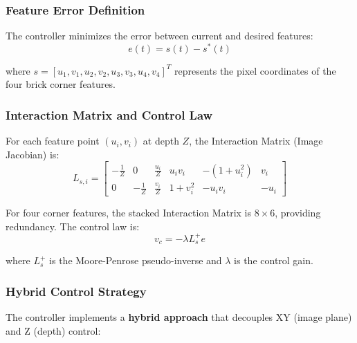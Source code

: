 \subsubsection{Feature Error Definition}
The controller minimizes the error between current and desired features:
\begin{equation}
    e(t) = s(t) - s^*(t)
\end{equation}

where $s = [u_1, v_1, u_2, v_2, u_3, v_3, u_4, v_4]^T$ represents the pixel coordinates of the four brick corner features.

\subsubsection{Interaction Matrix and Control Law}
For each feature point $(u_i, v_i)$ at depth $Z$, the Interaction Matrix (Image Jacobian) is:
\begin{equation}
    L_{s,i} = \begin{bmatrix}
        -\frac{1}{Z} & 0 & \frac{u_i}{Z} & u_i v_i & -(1+u_i^2) & v_i \\
        0 & -\frac{1}{Z} & \frac{v_i}{Z} & 1+v_i^2 & -u_i v_i & -u_i
    \end{bmatrix}
\end{equation}

For four corner features, the stacked Interaction Matrix is $8 \times 6$, providing redundancy. The control law is:
\begin{equation}
    v_c = -\lambda L_s^+ e
\end{equation}

where $L_s^+$ is the Moore-Penrose pseudo-inverse and $\lambda$ is the control gain.

\subsubsection{Hybrid Control Strategy}
The controller implements a \textbf{hybrid approach} that decouples XY (image plane) and Z (depth) control:

